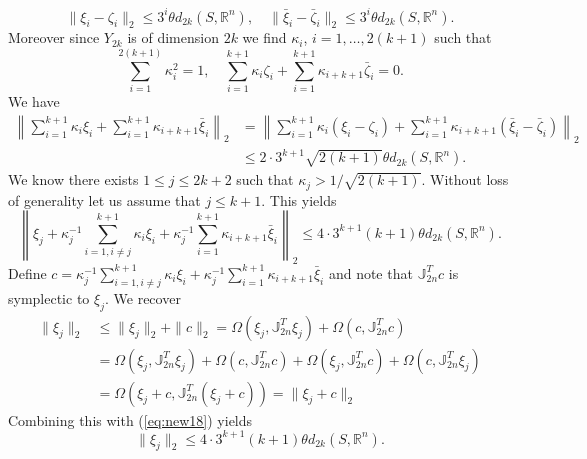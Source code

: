 \begin{equation}
	\| \xi_i - \zeta_i \|_2 \leq 3^i \theta d_{2k}(S,\mathbb R^n),\quad \| \bar{\xi}_i - \bar{\zeta}_i \|_2 \leq 3^i \theta d_{2k}(S,\mathbb R^n).
\end{equation}
Moreover since $Y_{2k}$ is of dimension $2k$ we find $\kappa_i$, $i=1,\dots,2(k+1)$ such that
\begin{equation} \label{eq:new15}
	\sum_{i=1}^{2(k+1)} \kappa_i^2 = 1, \quad\sum_{i=1}^{k+1} \kappa_i \zeta_i + \sum_{i=1}^{k+1} \kappa_{i+k+1} \bar{\zeta}_i = 0.
\end{equation}
We have
\begin{equation} \label{eq:new17}
\begin{aligned}
	\left\| \sum_{i=1}^{k+1} \kappa_i \xi_i + \sum_{i=1}^{k+1} \kappa_{i+k+1} \bar{\xi}_i \right\|_2 &= \left\| \sum_{i=1}^{k+1} \kappa_i (\xi_i - \zeta_i) + \sum_{i=1}^{k+1} \kappa_{i+k+1} (\bar{\xi}_i-\bar{\zeta}_i) \right\|_2 \\
	&\leq 2\cdot 3^{k+1} \sqrt{2(k+1)} \theta d_{2k}(S,\mathbb R^n).
\end{aligned}
\end{equation}
We know there exists $1 \leq j\leq 2k+2$ such that $\kappa_j > 1/\sqrt{2(k+1)}$. Without loss of generality let us assume that $j\leq k+1$. This yields
\begin{equation} \label{eq:new18}
	\left\| \xi_j +  \kappa_j^{-1} \sum_{i=1,i\neq j}^{k+1} \kappa_i \xi_i + \kappa_j^{-1}\sum_{i=1}^{k+1} \kappa_{i+k+1} \bar{\xi}_i \right\|_2 \leq 4\cdot 3^{k+1} (k+1) \theta d_{2k}(S,\mathbb R^n).
\end{equation}
Define $c = \kappa_j^{-1} \sum_{i=1,i\neq j}^{k+1} \kappa_i \xi_i + \kappa_j^{-1}\sum_{i=1}^{k+1} \kappa_{i+k+1} \bar{\xi}_i$ and note that $\mathbb{J}_{2n}^T c$ is symplectic to $\xi_j$. We recover
\begin{equation} \label{eq:new19}
\begin{aligned}
	\| \xi_j \|_2 &\leq \| \xi_j \|_2 + \| c \|_2 = \Omega(\xi_j,\mathbb{J}_{2n}^T \xi_j) + \Omega(c,\mathbb{J}_{2n}^T c) \\
	       &= \Omega(\xi_j,\mathbb{J}_{2n}^T \xi_j) + \Omega(c,\mathbb{J}_{2n}^T c) + \Omega(\xi_j,\mathbb{J}_{2n}^T c) + \Omega(c,\mathbb{J}_{2n}^T \xi_j) \\
       	&= \Omega(\xi_j + c, \mathbb{J}^T_{2n} (\xi_j + c)) = \| \xi_j + c \|_2	
\end{aligned}
\end{equation}
Combining this with (\ref{eq:new18}) yields
\begin{equation} \label{eq:new20}
	\| \xi_j \|_2 \leq 4\cdot 3^{k+1} (k+1) \theta d_{2k}(S,\mathbb R^n).
\end{equation}
